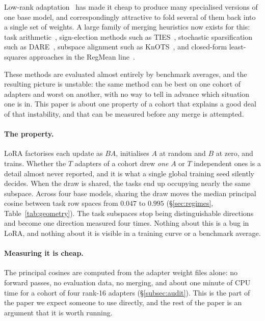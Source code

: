 Low-rank adaptation~\citep{hu2022lora} has made it cheap to produce many
specialised versions of one base model, and correspondingly attractive to
fold several of them back into a single set of weights. A large family of
merging heuristics now exists for this: task
arithmetic~\citep{ilharco2023task}, sign-election methods such as
TIES~\citep{yadav2023ties}, stochastic sparsification such as
DARE~\citep{yu2024dare}, subspace alignment such as
KnOTS~\citep{stoica2025knots}, and closed-form least-squares approaches in
the RegMean line~\citep{jin2023regmean,lorm2024,regmeanpp2025}.

These methods are evaluated almost entirely by benchmark averages, and the
resulting picture is unstable: the same method can be best on one cohort of
adapters and worst on another, with no way to tell in advance which
situation one is in. This paper is about one property of a cohort that
explains a good deal of that instability, and that can be measured before
any merge is attempted.

\paragraph{The property.} LoRA factorises each update as $BA$, initialises
$A$ at random and $B$ at zero, and trains. Whether the $T$ adapters of a
cohort drew \emph{one} $A$ or $T$ independent ones is a detail almost never
reported, and it is what a single global training seed silently decides.
When the draw is shared, the tasks end up occupying nearly the same
subspace. Across four base models, sharing the draw moves the median
principal cosine between task row spaces from $0.047$ to $0.995$
(\S\ref{sec:regimes}, Table~\ref{tab:geometry}). The task subspaces stop
being distinguishable directions and become one direction measured four
times. Nothing about this is a bug in LoRA, and nothing about it is visible
in a training curve or a benchmark average.

\paragraph{Measuring it is cheap.} The principal cosines are computed from
the adapter weight files alone: no forward passes, no evaluation data, no
merging, and about one minute of CPU time for a cohort of four rank-16
adapters (\S\ref{subsec:audit}). This is the part of the paper we expect
someone to use directly, and the rest of the paper is an argument that it
is worth running.

